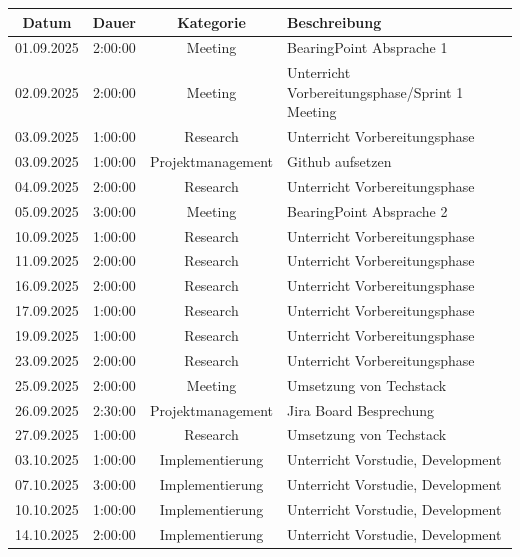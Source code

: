 \documentclass{article}
\begin{document}
\begin{table}[H]
  \centering
  \begin{tabularx}{\textwidth}{|c|c|c|X|}
    \hline
    \rowcolor{black!10}\textbf{Datum} & \textbf{Dauer} & \textbf{Kategorie} & \textbf{Beschreibung} \\
    \hline
    01.09.2025 & 2:00:00 & Meeting           & BearingPoint Absprache 1 \\ \hline
    02.09.2025 & 2:00:00 & Meeting           & Unterricht Vorbereitungsphase/Sprint 1 Meeting \\ \hline
    03.09.2025 & 1:00:00 & Research          & Unterricht Vorbereitungsphase \\ \hline
    03.09.2025 & 1:00:00 & Projektmanagement & Github aufsetzen \\ \hline
    04.09.2025 & 2:00:00 & Research          & Unterricht Vorbereitungsphase \\ \hline
    05.09.2025 & 3:00:00 & Meeting           & BearingPoint Absprache 2 \\ \hline
    10.09.2025 & 1:00:00 & Research          & Unterricht Vorbereitungsphase \\ \hline
    11.09.2025 & 2:00:00 & Research          & Unterricht Vorbereitungsphase \\ \hline
    16.09.2025 & 2:00:00 & Research          & Unterricht Vorbereitungsphase \\ \hline
    17.09.2025 & 1:00:00 & Research          & Unterricht Vorbereitungsphase \\ \hline
    19.09.2025 & 1:00:00 & Research          & Unterricht Vorbereitungsphase \\ \hline
    23.09.2025 & 2:00:00 & Research          & Unterricht Vorbereitungsphase \\ \hline
    25.09.2025 & 2:00:00 & Meeting           & Umsetzung von Techstack \\ \hline
    26.09.2025 & 2:30:00 & Projektmanagement & Jira Board Besprechung \\ \hline
    27.09.2025 & 1:00:00 & Research          & Umsetzung von Techstack \\ \hline
    03.10.2025 & 1:00:00 & Implementierung   & Unterricht Vorstudie, Development \\ \hline
    07.10.2025 & 3:00:00 & Implementierung   & Unterricht Vorstudie, Development \\ \hline
    10.10.2025 & 1:00:00 & Implementierung   & Unterricht Vorstudie, Development \\ \hline
    14.10.2025 & 2:00:00 & Implementierung   & Unterricht Vorstudie, Development \\ \hline

\end{tabularx}
\end{table}
\end{document}
